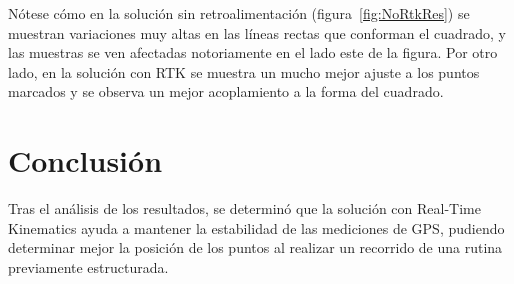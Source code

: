 Nótese cómo en la solución sin retroalimentación (figura~\ref{fig:NoRtkRes}) se muestran variaciones muy altas en las líneas rectas que conforman el cuadrado, y las muestras se ven afectadas notoriamente en el lado este de la figura. Por otro lado, en la solución con RTK se muestra un mucho mejor ajuste a los puntos marcados y se observa un mejor acoplamiento a la forma del cuadrado.

\section{Conclusión}
Tras el análisis de los resultados, se determinó que la solución con Real-Time Kinematics ayuda a mantener la estabilidad de las mediciones de GPS, pudiendo determinar mejor la posición de los puntos al realizar un recorrido de una rutina previamente estructurada.